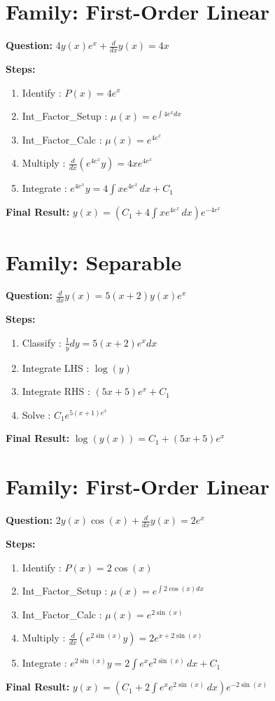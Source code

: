 \documentclass{article}
\begin{document}
\section*{Family: First-Order Linear}
\textbf{Question:} $4 y{\left(x \right)} e^{x} + \frac{d}{d x} y{\left(x \right)} = 4 x$

\textbf{Steps:}
\begin{enumerate}
\item Identify :  $P(x) = 4 e^{x}$
\item Int_Factor_Setup :  $\mu(x) = e^{\int 4 e^{x} dx}$
\item Int_Factor_Calc :  $\mu(x) = e^{4 e^{x}}$
\item Multiply :  $\frac{d}{dx}(e^{4 e^{x}}y) = 4 x e^{4 e^{x}}$
\item Integrate :  $e^{4 e^{x}}y = 4 \int x e^{4 e^{x}}\, dx + C_1$
\end{enumerate}
\textbf{Final Result:} $y{\left(x \right)} = \left(C_{1} + 4 \int x e^{4 e^{x}}\, dx\right) e^{- 4 e^{x}}$

\section*{Family: Separable}
\textbf{Question:} $\frac{d}{d x} y{\left(x \right)} = 5 \left(x + 2\right) y{\left(x \right)} e^{x}$

\textbf{Steps:}
\begin{enumerate}
\item Classify :  $\frac{1}{y} dy = 5 \left(x + 2\right) e^{x} dx$
\item Integrate LHS :  $\log{\left(y \right)}$
\item Integrate RHS :  $\left(5 x + 5\right) e^{x} + C_1$
\item Solve :  $C_{1} e^{5 \left(x + 1\right) e^{x}}$
\end{enumerate}
\textbf{Final Result:} $\log{\left(y{\left(x \right)} \right)} = C_{1} + \left(5 x + 5\right) e^{x}$

\section*{Family: First-Order Linear}
\textbf{Question:} $2 y{\left(x \right)} \cos{\left(x \right)} + \frac{d}{d x} y{\left(x \right)} = 2 e^{x}$

\textbf{Steps:}
\begin{enumerate}
\item Identify :  $P(x) = 2 \cos{\left(x \right)}$
\item Int_Factor_Setup :  $\mu(x) = e^{\int 2 \cos{\left(x \right)} dx}$
\item Int_Factor_Calc :  $\mu(x) = e^{2 \sin{\left(x \right)}}$
\item Multiply :  $\frac{d}{dx}(e^{2 \sin{\left(x \right)}}y) = 2 e^{x + 2 \sin{\left(x \right)}}$
\item Integrate :  $e^{2 \sin{\left(x \right)}}y = 2 \int e^{x} e^{2 \sin{\left(x \right)}}\, dx + C_1$
\end{enumerate}
\textbf{Final Result:} $y{\left(x \right)} = \left(C_{1} + 2 \int e^{x} e^{2 \sin{\left(x \right)}}\, dx\right) e^{- 2 \sin{\left(x \right)}}$
\end{document}
